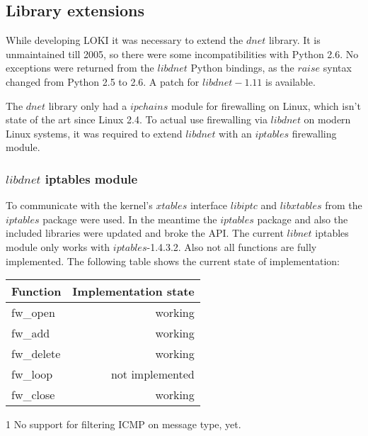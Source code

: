 \documentclass[a4paper, 11pt]{article}
\begin{document}
        \subsection{Library extensions}

        While developing LOKI it was necessary to extend the $dnet$ library. It is unmaintained till 2005, so there were some incompatibilities with Python 2.6. No exceptions were returned from the $libdnet$ Python bindings, as the $raise$ syntax changed from Python 2.5 to 2.6. A patch for $libdnet-1.11$ is available.

        The $dnet$ library only had a $ipchains$ module for firewalling on Linux, which isn't state of the art since Linux 2.4. To actual use firewalling via $libdnet$ on modern Linux systems, it was required to extend $libdnet$ with an $iptables$ firewalling module.

        \subsubsection{$libdnet$ iptables module}
        
            To communicate with the kernel's $xtables$ interface $libiptc$ and $libxtables$ from the $iptables$ package were used. In the meantime the $iptables$ package and also the included libraries were updated and broke the API. The current $libnet$ iptables module only works with $iptables$-1.4.3.2. Also not all functions are fully implemented. The following table shows the current state of implementation:
            \\
            
            \begin{threeparttable}
                \begin{tabular}{|l|r|}
                    \hline
                    Function & Implementation state\\
                    \hline
                    \hline
                    fw\_open & working\\
                    fw\_add & working\tnote{1}\\
                    fw\_delete & working\\
                    fw\_loop & not implemented\\
                    fw\_close & working\\
                    \hline
                \end{tabular}
                \begin{tablenotes}\footnotesize 
                    \item[1] No support for filtering ICMP on message type, yet.
                \end{tablenotes}
            \end{threeparttable}
            \\
                
\end{document}
